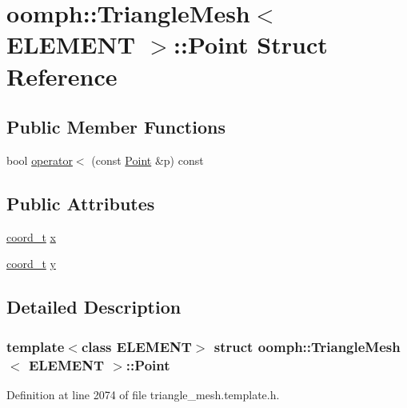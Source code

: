 \hypertarget{structoomph_1_1TriangleMesh_1_1Point}{}\section{oomph\+:\+:Triangle\+Mesh$<$ E\+L\+E\+M\+E\+NT $>$\+:\+:Point Struct Reference}
\label{structoomph_1_1TriangleMesh_1_1Point}
\subsection*{Public Member Functions}
\begin{DoxyCompactItemize}
\item 
bool \hyperlink{structoomph_1_1TriangleMesh_1_1Point_a51a65a16bcb72e3b18102f0ab8001d0c}{operator$<$} (const \hyperlink{structoomph_1_1TriangleMesh_1_1Point}{Point} \&p) const
\end{DoxyCompactItemize}
\subsection*{Public Attributes}
\begin{DoxyCompactItemize}
\item 
\hyperlink{classoomph_1_1TriangleMesh_ad50b14a66b40a3bfb22a43df86c9006e}{coord\+\_\+t} \hyperlink{structoomph_1_1TriangleMesh_1_1Point_a3d99bdf85c838801260dda624a518133}{x}
\item 
\hyperlink{classoomph_1_1TriangleMesh_ad50b14a66b40a3bfb22a43df86c9006e}{coord\+\_\+t} \hyperlink{structoomph_1_1TriangleMesh_1_1Point_a0ce04810567f9e1cd9acf211073a35da}{y}
\end{DoxyCompactItemize}


\subsection{Detailed Description}
\subsubsection*{template$<$class E\+L\+E\+M\+E\+NT$>$\newline
struct oomph\+::\+Triangle\+Mesh$<$ E\+L\+E\+M\+E\+N\+T $>$\+::\+Point}



Definition at line 2074 of file triangle\+\_\+mesh.\+template.\+h.



